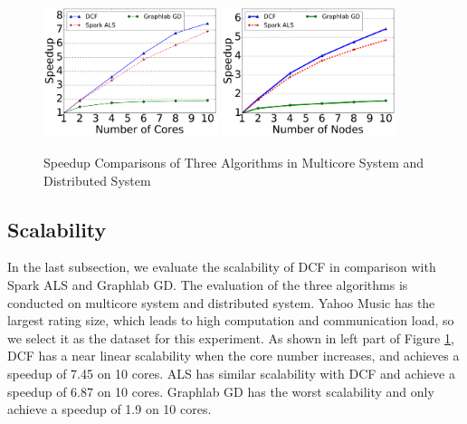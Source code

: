 \documentclass{llncs}
\begin{document}
\begin{figure}[!t]
\centering
\includegraphics[width=2in]{pics/core.pdf}
\includegraphics[width=2in]{pics/node.pdf}
\vspace{-10pt}
\caption{Speedup Comparisons of Three Algorithms in Multicore System and Distributed System}
\vspace{-15pt}
\label{fig:core}
\end{figure}


\vspace{-15pt}
\subsection{Scalability}
\label{sub:sca}

In the last subsection, we evaluate the scalability of DCF in comparison with Spark ALS and Graphlab GD. The evaluation of the three algorithms is conducted on multicore system and distributed system. Yahoo Music has the largest rating size, which leads to high computation and communication load, so we select it as the dataset for this experiment. As shown in left part of Figure \ref{fig:core}, DCF has a near linear scalability when the core number increases, and achieves a speedup of 7.45 on 10 cores. ALS has similar scalability with DCF and achieve a speedup of 6.87 on 10 cores. Graphlab GD has the worst scalability and only achieve a speedup of 1.9 on 10 cores.
\end{document}
